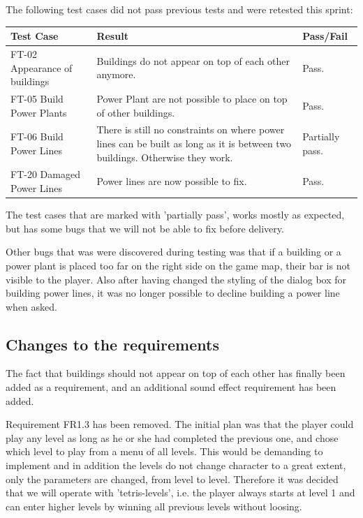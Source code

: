 	The following test cases did not pass previous tests and were retested this sprint:

	\begin{tabular}{| p{3cm} | p{7cm} | p{2cm} |}
		\hline
		\rowcolor{lightgray}
		{\bf Test Case} & {\bf Result} & {\bf Pass/Fail} \\ \hline
		
		FT-02 Appearance of buildings & Buildings do not appear on top of each other anymore. & Pass. \\ \hline
		
		FT-05 Build Power Plants & Power Plant are not possible to place on top of other buildings. & Pass. \\ \hline
		
		FT-06 Build Power Lines & There is still no constraints on where power lines can be built as long as it is between two buildings. Otherwise they work. & Partially pass. \\ \hline
		
		FT-20 Damaged Power Lines & Power lines are now possible to fix. & Pass. \\ \hline
	\end{tabular}

	The test cases that are marked with 'partially pass', works mostly as expected, but has some bugs 
	that we will not be able to fix before delivery.

	Other bugs that was were discovered during testing was that if a building or a power plant is placed 
	too far on the right side on the game map, their bar is not visible to the player. Also after having 
	changed the styling of the dialog box for building power lines, it was no longer possible to decline 
	building a power line when asked.

\subsection{Changes to the requirements}

	The fact that buildings should not appear on top of each other has finally been added as a requirement, and an additional sound effect requirement has been added.

	Requirement FR1.3 has been removed. The initial plan was that the player could play any level as long as he or she had completed the previous one, and chose which level to play from a menu of all levels. This would be demanding to implement and in addition the levels do not change character to a great extent, only the parameters are changed, from level to level. Therefore it was decided that we will operate with 'tetris-levels', i.e. the player always starts at level 1 and can enter higher levels by winning all previous levels without loosing. 

